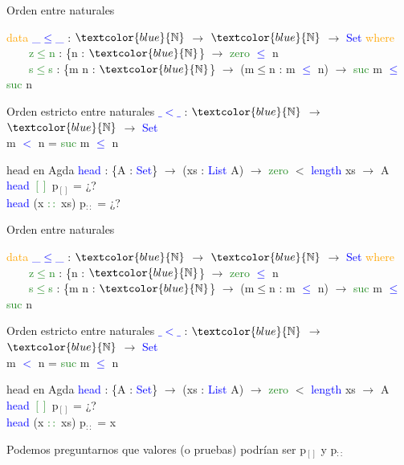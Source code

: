 \documentclass[xcolor=dvipsnames]{beamer} %
\newcommand{\cf}[1]{\textcolor{blue}{#1}}
\newcommand{\ct}[1]{\textcolor{blue}{#1}}
\newcommand{\cc}[1]{\textcolor{ForestGreen}{#1}}
\newcommand{\ck}[1]{\textcolor{orange}{#1}}
\newcommand{\N}{\ct{\mathbb{N}}}
\newcommand{\ra}{\rightarrow}
\begin{document}
\begin{frame}

\begin{block}{Orden entre naturales}

\ck{data} \ct{\_$\leq$\_} : $\N$ $\ra$ $\N$ $\ra$ \ct{Set} \ck{where}\\
\ \ \ \ \cc{z$\leq$n} : \{n : $\N$\}                 $\ra$ \cc{zero}  \ct{$\leq$} n\\
\ \ \ \ \cc{s$\leq$s} : \{m n : $\N$\} $\ra$ (m$\leq$n : m \ct{$\leq$} n) $\ra$ \cc{suc} m \ct{$\leq$} \cc{suc} n

\end{block}

\begin{block}{Orden estricto entre naturales}
\cf{$\_<\_$} : $\N$ $\ra$ $\N$ $\ra$ \ct{Set}\\
m \cf{$<$} n = \cc{suc} m \cf{$\leq$} n
\end{block}

\begin{block}{head en Agda}
    \cf{head} : \{A : \ct{Set}\}  $\ra$ (xs : \ct{List} A) $\ra$ 
    \cc{zero} $<$ \ct{length} xs $\rightarrow$ A \\
    \pause
    \cf{head} \cc{$[]$} p$_{[]}$ = ¿?\\
    \cf{head} (x \cc{$::$} xs) p$_{::}$ = ¿?
  \end{block}  

\end{frame}

\begin{frame}

\begin{block}{Orden entre naturales}

\ck{data} \ct{\_$\leq$\_} : $\N$ $\ra$ $\N$ $\ra$ \ct{Set} \ck{where}\\
\ \ \ \ \cc{z$\leq$n} : \{n : $\N$\}                 $\ra$ \cc{zero}  \ct{$\leq$} n\\
\ \ \ \ \cc{s$\leq$s} : \{m n : $\N$\} $\ra$ (m$\leq$n : m \ct{$\leq$} n) $\ra$ \cc{suc} m \ct{$\leq$} \cc{suc} n

\end{block}

\begin{block}{Orden estricto entre naturales}
\cf{$\_<\_$} : $\N$ $\ra$ $\N$ $\ra$ \ct{Set}\\
m \cf{$<$} n = \cc{suc} m \cf{$\leq$} n
\end{block}

\begin{block}{head en Agda}
    \cf{head} : \{A : \ct{Set}\}  $\ra$ (xs : \ct{List} A) $\ra$ 
    \cc{zero} $<$ \ct{length} xs $\rightarrow$ A \\
    \cf{head} \cc{$[]$} p$_{[]}$ = ¿?\\
    \cf{head} (x \cc{$::$} xs) p$_{::}$ = x
  \end{block}  

\pause

\begin{block}{}
Podemos preguntarnos que valores (o pruebas) podrían ser p$_{[]}$ y p$_{::}$
\end{block}

\end{frame}
\end{document}

